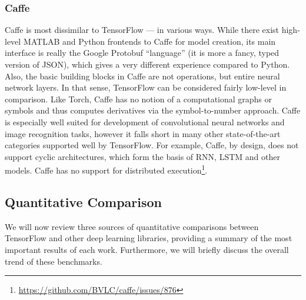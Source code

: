 \subsubsection{Caffe}\label{sec:comp-quality-caffe}

Caffe is most dissimilar to TensorFlow --- in various ways. While there exist
high-level MATLAB and Python frontends to Caffe for model creation, its main
interface is really the Google Protobuf ``language'' (it is more a fancy, typed
version of JSON), which gives a very different experience compared to
Python. Also, the basic building blocks in Caffe are not operations, but entire
neural network layers. In that sense, TensorFlow can be considered fairly
low-level in comparison. Like Torch, Caffe has no notion of a computational
graphs or symbols and thus computes derivatives via the symbol-to-number
approach. Caffe is especially well suited for development of convolutional
neural networks and image recognition tasks, however it falls short in many
other state-of-the-art categories supported well by TensorFlow. For example,
Caffe, by design, does not support cyclic architectures, which form the basis of
RNN, LSTM and other models. Caffe has no support for distributed
execution\footnote{\url{https://github.com/BVLC/caffe/issues/876}}.

\subsection{Quantitative Comparison}\label{sec:comp-quantity}

We will now review three sources of quantitative comparisons between TensorFlow
and other deep learning libraries, providing a summary of the most important
results of each work. Furthermore, we will briefly discuss the overall trend of
these benchmarks.

